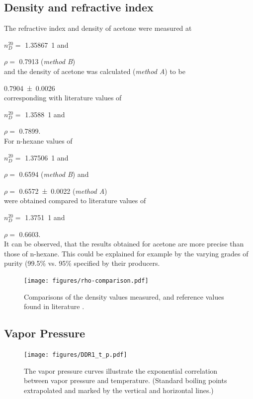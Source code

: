 {\subsection{Density and refractive index}

The refractive index and density of acetone were measured at 

$n_D^{20} =$ \qty{1.35867}{1} and 

$\rho = $ \qty{0.7913}{\density} (\textit{method B}) 
\\and the density of acetone was calculated (\textit{method A}) to be 

\qty{0.7904 \pm 0.0026}{\density} 
\\corresponding with literature values of 

$n_D^{20} =$ \qty{1.3588}{1} and 

$\rho = $ \qty{0.7899}{\density}. \cite{meister} 
\\For n-hexane values of 

$n_D^{20} =$ \qty{1.37506}{1} and 

$\rho = $ \qty{0.6594}{\density} (\textit{method B}) and 

$\rho = $ \qty{0.6572 \pm 0.0022}{\density} (\textit{method A}) 
\\were obtained compared to literature values of 

$n_D^{20} =$ \qty{1.3751}{1} and 

$\rho = $ \qty{0.6603}{\density}. \cite{meister} 
\\It can be observed, that the results obtained for acetone are more precise than those of n-hexane. This could be explained for example by the varying grades of purity (99.5\% vs. 95\% specified by their producers.
\begin{figure}[H]
    \centering
    \texttt{[image: figures/rho-comparison.pdf]}
    \caption{Comparisons of the density values measured, and reference values found in literature \cite{meister}.}
    \label{fig:rho_comp}
\end{figure}


\subsection{Vapor Pressure}

\begin{figure}[H]
    \centering
    \texttt{[image: figures/DDR1\_t\_p.pdf]}
    \caption{The vapor pressure curves illustrate the exponential correlation between vapor pressure and temperature. (Standard boiling points extrapolated and marked by the vertical and horizontal lines.)}
    \label{fig:ddr1_t_p}
\end{figure}

}
